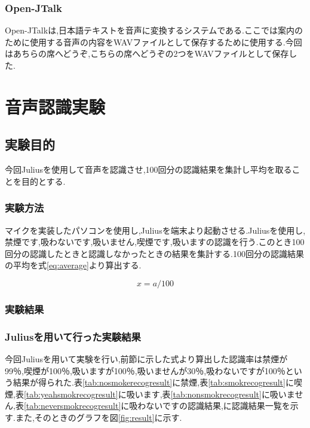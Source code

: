 \documentclass[12pt,oneside]{sotsuken_paper}
\begin{document}
\subsection{Open-JTalk}
Open-JTalkは,日本語テキストを音声に変換するシステムである.ここでは案内のために使用する音声の内容をWAVファイルとして保存するために使用する.今回はあちらの席へどうぞ,こちらの席へどうぞの2つをWAVファイルとして保存した.


\chapter{音声認識実験}
\section{実験目的}
今回Juliusを使用して音声を認識させ,100回分の認識結果を集計し平均を取ることを目的とする.


\subsection{実験方法}
マイクを実装したパソコンを使用し,Juliusを端末より起動させる.Juliusを使用し,禁煙です,吸わないです,吸いません,喫煙です,吸いますの認識を行う.このとき100回分の認識したときと認識しなかったときの結果を集計する.100回分の認識結果の平均を式\ref{eq:average}より算出する.

\setcounter{equation}{0}
\begin{equation}
  x = a / 100
\end{equation}
\label{eq:average}


\subsection{実験結果}
\subsection{Juliusを用いて行った実験結果}
今回Juliusを用いて実験を行い,前節に示した式より算出した認識率は禁煙が99％,喫煙が100％,吸いますが100％,吸いませんが30％,吸わないですが100％という結果が得られた.表\ref{tab:nosmokerecogresult}に禁煙,表\ref{tab:smokrecogresult}に喫煙,表\ref{tab:yeahsmokrecogresult}に吸います,表\ref{tab:nonsmokrecogresult}に吸いません,表\ref{tab:neversmokrecogresult}に吸わないですの認識結果,\label{tab:result}に認識結果一覧を示す.また,そのときのグラフを図\ref{fig:result}に示す.
\end{document}
